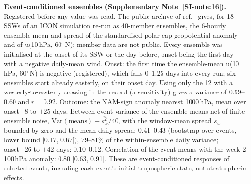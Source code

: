 \documentclass[11pt]{article}
\begin{document}
\textbf{Event-conditioned ensembles (Supplementary Note~\ref{SI-note:16}).} Registered before any value was read. The public archive of ref.~\cite{loeffel26} gives, for 18 SSWs of an ICON simulation re-run as 40-member ensembles, the 6-hourly ensemble mean and spread of the standardised polar-cap geopotential anomaly and of u(10\,hPa, 60$^\circ$\,N); member data are not public. Every ensemble was initialised at the onset of its SSW or the day before, onset being the first day with a negative daily-mean wind\cite{loeffel26}. Onset: the first time the ensemble-mean u(10\,hPa, 60$^\circ$\,N) is negative (registered), which falls 0–1.25 days into every run; six ensembles start already easterly, on their onset day. Using only the 12 with a westerly-to-easterly crossing in the record (a sensitivity) gives a variance of 0.59–0.60 and $r = 0.92.$ Outcome: the NAM-sign anomaly nearest 1000\,hPa, mean over onset+8 to $+25$ days. Between-event variance of the ensemble means net of finite-ensemble noise, $\mathrm{Var}(\text{means}) - \overline{s_w^2}/40$, with the window-mean spread $s_w$ bounded by zero and the mean daily spread: 0.41–0.43 (bootstrap over events, lower bound [0.17, 0.67]), 79–81\% of the within-ensemble daily variance; onset+26 to $+42$ days: 0.10–0.12. Correlation of the event means with the week-2 100\,hPa anomaly: 0.80 [0.63, 0.91]. These are event-conditioned responses of selected events, including each event's initial tropospheric state, not stratospheric effects.
\end{document}
